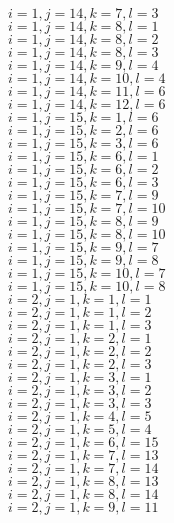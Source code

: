 \documentclass[14pt]{article}
\begin{document}
    $i=1,j=14,k=7,l=3 $ \\ 
    $i=1,j=14,k=8,l=1 $ \\ 
    $i=1,j=14,k=8,l=2 $ \\ 
    $i=1,j=14,k=8,l=3 $ \\ 
    $i=1,j=14,k=9,l=4 $ \\ 
    $i=1,j=14,k=10,l=4 $ \\ 
    $i=1,j=14,k=11,l=6 $ \\ 
    $i=1,j=14,k=12,l=6 $ \\ 
    $i=1,j=15,k=1,l=6 $ \\ 
    $i=1,j=15,k=2,l=6 $ \\ 
    $i=1,j=15,k=3,l=6 $ \\ 
    $i=1,j=15,k=6,l=1 $ \\ 
    $i=1,j=15,k=6,l=2 $ \\ 
    $i=1,j=15,k=6,l=3 $ \\ 
    $i=1,j=15,k=7,l=9 $ \\ 
    $i=1,j=15,k=7,l=10 $ \\ 
    $i=1,j=15,k=8,l=9 $ \\ 
    $i=1,j=15,k=8,l=10 $ \\ 
    $i=1,j=15,k=9,l=7 $ \\ 
    $i=1,j=15,k=9,l=8 $ \\ 
    $i=1,j=15,k=10,l=7 $ \\ 
    $i=1,j=15,k=10,l=8 $ \\ 
    $i=2,j=1,k=1,l=1 $ \\ 
    $i=2,j=1,k=1,l=2 $ \\ 
    $i=2,j=1,k=1,l=3 $ \\ 
    $i=2,j=1,k=2,l=1 $ \\ 
    $i=2,j=1,k=2,l=2 $ \\ 
    $i=2,j=1,k=2,l=3 $ \\ 
    $i=2,j=1,k=3,l=1 $ \\ 
    $i=2,j=1,k=3,l=2 $ \\ 
    $i=2,j=1,k=3,l=3 $ \\ 
    $i=2,j=1,k=4,l=5 $ \\ 
    $i=2,j=1,k=5,l=4 $ \\ 
    $i=2,j=1,k=6,l=15 $ \\ 
    $i=2,j=1,k=7,l=13 $ \\ 
    $i=2,j=1,k=7,l=14 $ \\ 
    $i=2,j=1,k=8,l=13 $ \\ 
    $i=2,j=1,k=8,l=14 $ \\ 
    $i=2,j=1,k=9,l=11 $ \\ 
\end{document}
